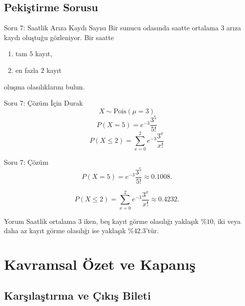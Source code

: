 \documentclass[light]{lutbeamer}
\begin{document}
\subsection{Pekiştirme Sorusu}

\begin{frame}{Soru 7: Saatlik Arıza Kaydı Sayısı}
    \small
    Bir sunucu odasında saatte ortalama \(3\) arıza kaydı oluştuğu gözleniyor. Bir saatte
    \begin{enumerate}
        \item[(a)] tam \(5\) kayıt,
        \item[(b)] en fazla \(2\) kayıt
    \end{enumerate}
    oluşma olasılıklarını bulun.
\end{frame}

\begin{frame}{Soru 7: Çözüm İçin Durak}
    \color{red!70!black}
    \small
    \[
    X \sim \text{Pois}(\mu=3)
    \]
    \[
    P(X=5)=e^{-3}\frac{3^5}{5!}
    \]
    \[
    P(X\le 2)=\sum_{x=0}^{2} e^{-3}\frac{3^x}{x!}
    \]
\end{frame}

\begin{frame}{Soru 7: Çözüm}
    \small
    \[
    P(X=5)=e^{-3}\frac{3^5}{5!}\approx 0.1008.
    \]

    \[
    P(X\le 2)=\sum_{x=0}^{2} e^{-3}\frac{3^x}{x!}\approx 0.4232.
    \]

    \begin{exampleblock}{Yorum}
        Saatlik ortalama \(3\) iken, beş kayıt görme olasılığı yaklaşık \(\%10\), iki veya daha az kayıt görme olasılığı ise yaklaşık \(\%42.3\)'tür.
    \end{exampleblock}
\end{frame}

\section{Kavramsal Özet ve Kapanış}
\subsection{Karşılaştırma ve Çıkış Bileti}
\end{document}
